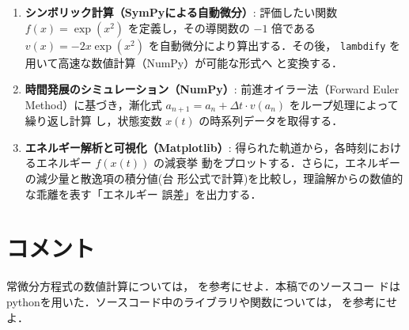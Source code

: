   \begin{enumerate}
   \item \textbf{シンボリック計算（SymPyによる自動微分）}:
	 評価したい関数 $f(x) = \exp(x^2)$ を定義し，その導関数の $-1$
	 倍である $v(x) = -2x\exp(x^2)$ を自動微分により算出する．その後，
	 \texttt{lambdify} を用いて高速な数値計算（NumPy）が可能な形式へ
	 と変換する．
	 
   \item \textbf{時間発展のシミュレーション（NumPy）}:
	 前進オイラー法（Forward Euler Method）に基づき，漸化式 $a_{n+1}
	 = a_n + \Delta t \cdot v(a_n)$ をループ処理によって繰り返し計算
	 し，状態変数 $x(t)$ の時系列データを取得する．
    
    \item \textbf{エネルギー解析と可視化（Matplotlib）}:
	  得られた軌道から，各時刻におけるエネルギー $f(x(t))$ の減衰挙
	 動をプロットする．さらに，エネルギーの減少量と散逸項の積分値(台
	 形公式で計算)を比較し，理論解からの数値的な乖離を表す「エネルギー
	 誤差」を出力する．
  \end{enumerate}

\section{コメント}

常微分方程式の数値計算については，
\cites{BC08225057,BA32760992,BB20100756}を参考にせよ．本稿でのソースコー
ドはpythonを用いた．ソースコード中のライブラリや関数については，
\cite{BB30665488}を参考にせよ．